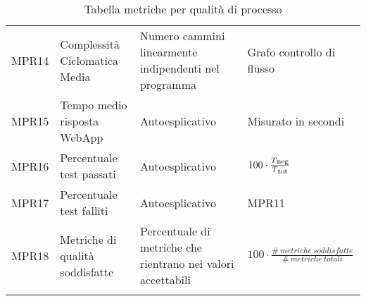 {\begin{longtable}{C{.115\freewidth} C{.257\freewidth} C{.26\freewidth} C{.4\freewidth}}
    MPR14 & Complessità Ciclomatica Media & Numero cammini linearmente indipendenti nel programma & Grafo controllo di flusso \\
    MPR15 & Tempo medio risposta WebApp & Autoesplicativo & Misurato in secondi \\
    MPR16 & Percentuale test passati & Autoesplicativo & $100\cdot \frac{T\textsubscript{neg}}{ T\textsubscript{tot}}$ \\
    MPR17 & Percentuale test falliti & Autoesplicativo & MPR11 \\
    MPR18 & Metriche di qualità soddisfatte & Percentuale di metriche che rientrano nei valori accettabili & $100\cdot \frac{\# \: metriche \: soddisfatte}{\# \: metriche \: totali}$ \\	   
    \bottomrule
    \caption{Tabella metriche per qualità di processo}
    \end{longtable}
}
